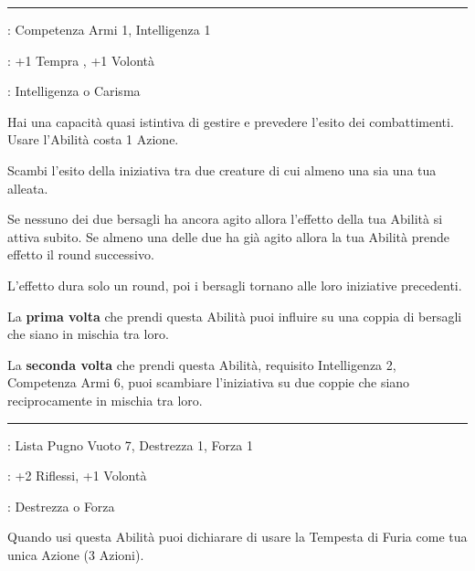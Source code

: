 \begin{multicols}{2}
\smallskip\noindent\rule{\linewidth}{2pt} \hypertarget{Tattico}{}\medskip{}
\noindent
\begin{description}[noitemsep, topsep=0pt, parsep=0pt, partopsep=0pt, leftmargin=0cm, labelwidth=2.5cm]
    \item[\textbf{Requisito}]: Competenza Armi 1, Intelligenza 1
    \item[\textbf{Tiri Salvezza}]: +1 Tempra , +1 Volontà
    \item[\textbf{Caratteristica}]: Intelligenza o Carisma
\end{description}

Hai una capacità quasi istintiva di gestire e prevedere l'esito dei combattimenti. Usare l'Abilità costa 1 Azione.

Scambi l'esito della iniziativa tra due creature di cui almeno una sia una tua alleata.

Se nessuno dei due bersagli ha ancora agito allora l'effetto della tua Abilità si attiva subito. Se almeno una delle due ha già agito allora la tua Abilità prende effetto il round successivo.

L'effetto dura solo un round, poi i bersagli tornano alle loro iniziative precedenti.

La \textbf{prima volta} che prendi questa Abilità puoi influire su una coppia di bersagli che siano in mischia tra loro.

La \textbf{seconda volta} che prendi questa Abilità, requisito Intelligenza 2, Competenza Armi 6, puoi scambiare l'iniziativa su due coppie che siano reciprocamente in mischia tra loro.

\smallskip\noindent\rule{\linewidth}{2pt} \hypertarget{Tempesta di Furia}{}\medskip{}
\noindent
\begin{description}[noitemsep, topsep=0pt, parsep=0pt, partopsep=0pt, leftmargin=0cm, labelwidth=2.5cm]
    \item[\textbf{Requisito}]: Lista Pugno Vuoto 7, Destrezza 1, Forza 1
    \item[\textbf{Tiri Salvezza}]: +2 Riflessi, +1 Volontà
    \item[\textbf{Caratteristica}]: Destrezza o Forza
\end{description}

Quando usi questa Abilità puoi dichiarare di usare la Tempesta di Furia come tua unica Azione (3 Azioni).


\end{multicols}
